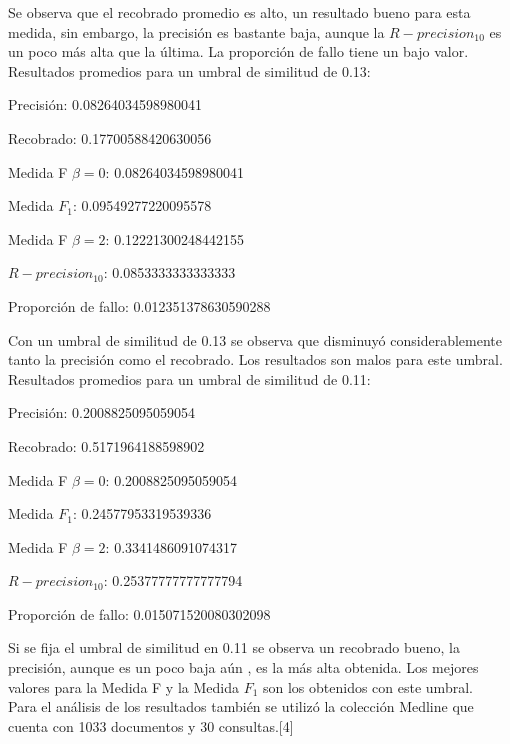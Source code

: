 \documentclass{llncs}
\begin{document}
Se observa que el recobrado promedio es alto, un resultado bueno para esta medida, sin embargo, la precisi\'on es bastante baja, aunque la $R-precision_10$ es un poco m\'as alta que la \'ultima. La proporci\'on de fallo tiene un bajo valor.\\ 

Resultados promedios para un umbral de similitud de 0.13:\\
\begin{list}{-}{•}
\item Precisi\'on: 0.08264034598980041
\item Recobrado: 0.17700588420630056
\item Medida F $\beta = 0$: 0.08264034598980041
\item Medida $F_1$: 0.09549277220095578
\item Medida F $\beta = 2$: 0.12221300248442155
\item $R-precision_10$: 0.0853333333333333
\item Proporci\'on de fallo: 0.012351378630590288
\end{list}

Con un umbral de similitud de 0.13 se observa que disminuy\'o considerablemente tanto la precisi\'on como el recobrado. Los resultados son malos para este umbral.\\

Resultados promedios para un umbral de similitud de 0.11:\\
\begin{list}{-}{•}
\item Precisi\'on: 0.2008825095059054
\item Recobrado: 0.5171964188598902
\item Medida F $\beta = 0$: 0.2008825095059054
\item Medida $F_1$: 0.24577953319539336
\item Medida F $\beta = 2$: 0.3341486091074317
\item $R-precision_10$: 0.25377777777777794
\item Proporci\'on de fallo: 0.015071520080302098
\end{list}

Si se fija el umbral de similitud en 0.11 se observa un recobrado bueno, la precisi\'on, aunque es un poco baja a\'un , es la m\'as alta obtenida. Los mejores valores para la Medida F y la Medida $F_1$ son los obtenidos con este umbral.\\


Para el an\'alisis de los resultados tambi\'en se utiliz\'o la colecci\'on Medline que cuenta con 1033 documentos y 30 consultas.[4]\\
\end{document}
